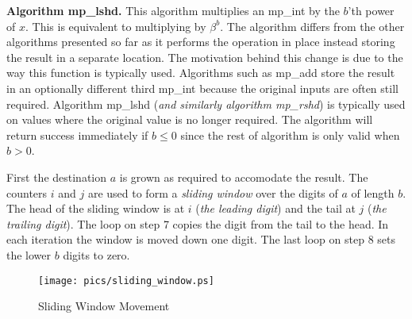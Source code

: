\documentclass[b5paper]{book}
\begin{document}
\textbf{Algorithm mp\_lshd.}
This algorithm multiplies an mp\_int by the $b$'th power of $x$.  This is equivalent to multiplying by $\beta^b$.  The algorithm differs 
from the other algorithms presented so far as it performs the operation in place instead storing the result in a separate location.  The
motivation behind this change is due to the way this function is typically used.  Algorithms such as mp\_add store the result in an optionally
different third mp\_int because the original inputs are often still required.  Algorithm mp\_lshd (\textit{and similarly algorithm mp\_rshd}) is
typically used on values where the original value is no longer required.  The algorithm will return success immediately if 
$b \le 0$ since the rest of algorithm is only valid when $b > 0$.  

First the destination $a$ is grown as required to accomodate the result.  The counters $i$ and $j$ are used to form a \textit{sliding window} over
the digits of $a$ of length $b$.  The head of the sliding window is at $i$ (\textit{the leading digit}) and the tail at $j$ (\textit{the trailing digit}).  
The loop on step 7 copies the digit from the tail to the head.  In each iteration the window is moved down one digit.   The last loop on 
step 8 sets the lower $b$ digits to zero.

\newpage
\begin{center}
\begin{figure}[here]
\texttt{[image: pics/sliding\_window.ps]}
\caption{Sliding Window Movement}
\end{figure}
\end{center}
\end{document}
